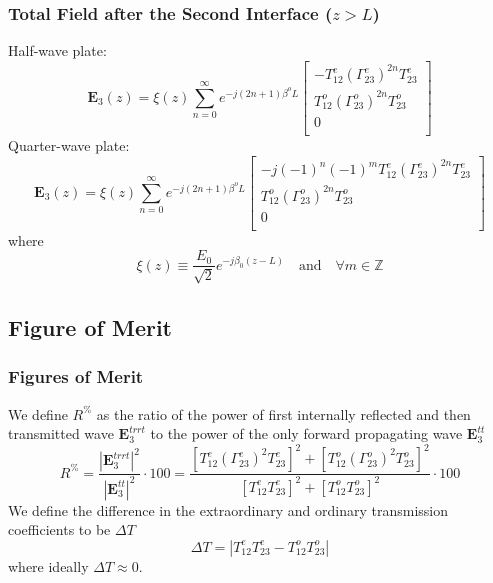 \documentclass[aspectratio=169,t,xcolor=table]{beamer}
\newcommand{\bv}[1]{\mathbf{#1}}
\begin{document}
        \begin{frame}
            \frametitle{Total Field after the Second Interface ($z>L$)}
            Half-wave plate:
              \begin{equation}\label{eq:E3_HWP}
                \bv{E}_3(z) = \xi(z)
                \sum_{n=0}^\infty e^{-j(2n+1)\beta^oL}
                \begin{bmatrix}
                    -T_{12}^e(\Gamma_{23}^e)^{2n}T_{23}^e\\
                    T_{12}^o(\Gamma_{23}^o)^{2n}T_{23}^o\\
                    0\\
                \end{bmatrix}
              \end{equation}
              Quarter-wave plate:
              \begin{equation}\label{eq:E3_QWP}
                \bv{E}_3(z) = \xi(z)
                \sum_{n=0}^\infty e^{-j(2n+1)\beta^oL}
                \begin{bmatrix}
                    -j(-1)^n(-1)^mT_{12}^e(\Gamma_{23}^e)^{2n}T_{23}^e\\
                    T_{12}^o(\Gamma_{23}^o)^{2n}T_{23}^o\\
                    0\\
                \end{bmatrix}
              \end{equation}
              where 
              $$
              \xi(z) \equiv \frac{E_0}{\sqrt{2}}e^{-j\beta_0(z-L)}
              \quad\text{and}\quad
              \forall m\in\mathbb{Z}
              $$
        \end{frame}

        \subsection{Figure of Merit}
        \begin{frame}
            \frametitle{Figures of Merit}\pause
            We define $R^\%$ as the ratio of the power of first internally 
            reflected and then transmitted wave $\bv{E}_3^{trrt}$ to the power 
            of the only forward propagating wave $\bv{E}_3^{tt}$
            \begin{equation}\label{eq:RP}
                R^\% = \frac{|\bv{E}_3^{trrt}|^2}{|\bv{E}_3^{tt}|^2} \cdot 100 = 
                \frac{
                \left[T^e_{12}(\Gamma^e_{23})^2T^e_{23}\right]^2 + 
                \left[T^o_{12}(\Gamma^o_{23})^2T^o_{23}\right]^2
                }{\left[T^e_{12}T^e_{23}\right]^2 + 
                \left[T^o_{12}T^o_{23}\right]^2} \cdot 100
                \end{equation}\pause
            We define the difference in the extraordinary and ordinary 
            transmission coefficients to be $\Delta T$
                \begin{equation}\label{eq:delta_T}
                    \Delta T = |T_{12}^e T_{23}^e - T_{12}^o T_{23}^o|
                  \end{equation}
            where ideally $\Delta T\approx 0$. 
        \end{frame}
\end{document}
